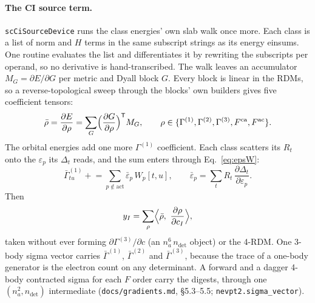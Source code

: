 \documentclass[11pt]{article}
\newcommand{\code}[1]{\texttt{#1}}
\newcommand{\G}[1]{\Gamma^{(#1)}}
\newcommand{\eps}{\varepsilon}
\newcommand{\Fca}{F^{\mathrm{ca}}}
\newcommand{\Fac}{F^{\mathrm{ac}}}
\begin{document}
\paragraph{The CI source term.} \code{scCiSourceDevice} runs the class
energies' own slab walk once more. Each class is a list of norm and $H$ terms
in the same subscript strings as its energy einsums. One routine evaluates the
list and differentiates it by rewriting the subscripts per operand, so no
derivative is hand-transcribed. The walk leaves an accumulator $M_G =
\partial E/\partial G$ per metric and Dyall block $G$. Every block is linear
in the RDMs, so a reverse-topological sweep through the blocks' own builders
gives five coefficient tensors:
\begin{equation}
  \bar\rho = \frac{\partial E}{\partial\rho} = \sum_G
    \Bigl(\frac{\partial G}{\partial\rho}\Bigr)^{\mathsf T} M_G,
  \qquad \rho\in\{\G1,\G2,\G3,\Fca,\Fac\}.
  \label{eq:rdmadj}
\end{equation}
The orbital energies add one more $\G1$ coefficient. Each class scatters its
$R_t$ onto the $\eps_p$ its $\Delta_t$ reads, and the sum enters through
Eq.~\eqref{eq:epsW}:
\begin{equation}
  \bar\Gamma^{(1)}_{tu} \mathrel{+}= \sum_{p\notin\mathrm{act}}
    \bar\eps_p\,W_p[t,u],\qquad
  \bar\eps_p = \sum_t R_t\,\frac{\partial\Delta_t}{\partial\eps_p}.
  \label{eq:epsadj}
\end{equation}
Then
\begin{equation}
  y_I = \sum_\rho \Bigl\langle \bar\rho,\ \frac{\partial\rho}{\partial c_I}\Bigr\rangle,
  \label{eq:ysigma}
\end{equation}
taken without ever forming $\partial\G3/\partial c$ (an $n_a^6\,n_{\mathrm{det}}$
object) or the 4-RDM. One 3-body sigma vector carries $\bar\Gamma^{(1)}$,
$\bar\Gamma^{(2)}$ and $\bar\Gamma^{(3)}$, because the trace of a one-body
generator is the electron count on any determinant. A forward and a dagger
4-body contracted sigma for each $F$ order carry the digests, through one
$(n_a^2, n_{\mathrm{det}})$ intermediate (\code{docs/gradients.md}, \S5.3--5.5;
\code{nevpt2.sigma\_vector}).
\end{document}
